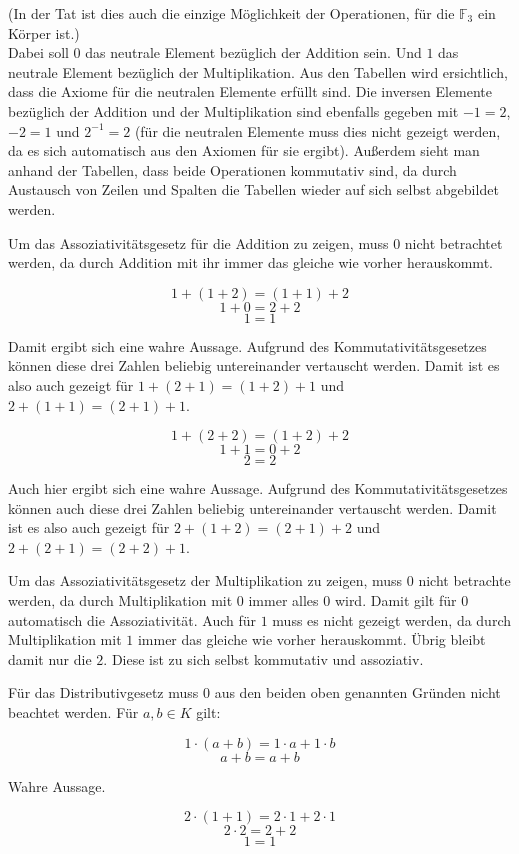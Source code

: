 \documentclass[11pt, a4paper]{article}
\begin{document}
		(In der Tat ist dies auch die einzige Möglichkeit der Operationen, für die $\mathbb{F}_3$ ein Körper ist.)\\

		Dabei soll $0$ das neutrale Element bezüglich der Addition sein. Und $1$ das neutrale Element bezüglich der Multiplikation. Aus den Tabellen wird ersichtlich, dass die Axiome für die neutralen Elemente erfüllt sind. 
		Die inversen Elemente bezüglich der Addition und der Multiplikation sind ebenfalls gegeben mit $-1 = 2$, $-2 = 1$ und $2^{-1} = 2$ (für die neutralen Elemente muss dies nicht gezeigt werden, da es sich automatisch aus den Axiomen für sie ergibt).
		Außerdem sieht man anhand der Tabellen, dass beide Operationen kommutativ sind, da durch Austausch von Zeilen und Spalten die Tabellen wieder auf sich selbst abgebildet werden.


		Um das Assoziativitätsgesetz für die Addition zu zeigen, muss $0$ nicht betrachtet werden, da durch Addition mit ihr immer das gleiche wie vorher herauskommt.

		\[ 1+(1+2) = (1+1)+2 \]
		\[ 1+0 = 2+2 \]
		\[ 1 = 1 \]

		Damit ergibt sich eine wahre Aussage. Aufgrund des Kommutativitätsgesetzes können diese drei Zahlen beliebig untereinander vertauscht werden. Damit ist es also auch gezeigt für $1+(2+1) = (1+2)+1$ und $2+(1+1) = (2+1)+1$.

		\[ 1+(2+2) = (1+2)+2 \]
		\[ 1+1 = 0+2 \]
		\[ 2 = 2 \]

		Auch hier ergibt sich eine wahre Aussage. Aufgrund des Kommutativitätsgesetzes können auch diese drei Zahlen beliebig untereinander vertauscht werden. Damit ist es also auch gezeigt für $2+(1+2) = (2+1)+2$ und $2+(2+1) = (2+2)+1$.

		Um das Assoziativitätsgesetz der Multiplikation zu zeigen, muss $0$ nicht betrachte werden, da durch Multiplikation mit $0$ immer alles $0$ wird. Damit gilt für $0$ automatisch die Assoziativität. Auch für $1$ muss es nicht gezeigt werden, da durch Multiplikation mit $1$ immer das gleiche wie vorher herauskommt. Übrig bleibt damit nur die $2$. Diese ist zu sich selbst kommutativ und assoziativ.

		Für das Distributivgesetz muss $0$ aus den beiden oben genannten Gründen nicht beachtet werden. Für $a,b \in K$ gilt:

		\[ 1\cdot (a+b) = 1\cdot a + 1\cdot b \]
		\[ a+b = a+b \]

		Wahre Aussage.
		
		\[ 2\cdot (1+1) = 2\cdot 1 + 2\cdot 1 \]
		\[ 2\cdot 2 = 2 + 2 \]
		\[ 1 = 1 \]
\end{document}
